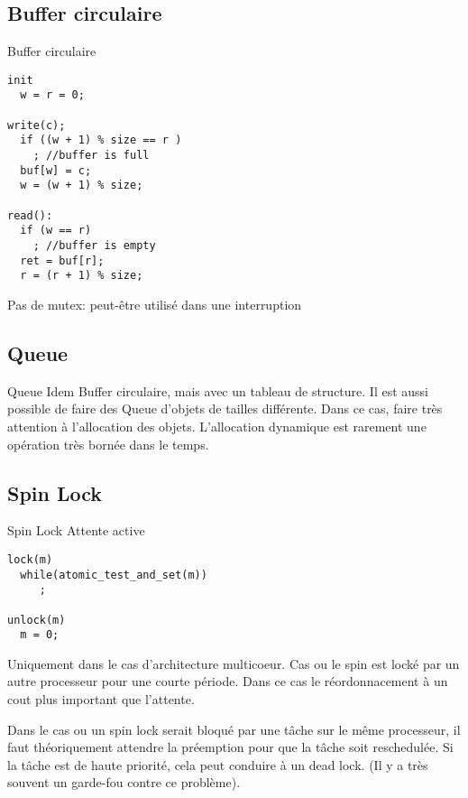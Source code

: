 \subsection{Buffer circulaire}
\begin{frame}[fragile]{Buffer circulaire}
\begin{lstlisting} 
init
  w = r = 0;

write(c);
  if ((w + 1) % size == r )
    ; //buffer is full
  buf[w] = c;
  w = (w + 1) % size;

read():
  if (w == r)
    ; //buffer is empty
  ret = buf[r];
  r = (r + 1) % size;
\end{lstlisting} 

Pas de mutex: peut-être utilisé dans une interruption
\end{frame} 

\subsection{Queue}
\begin{frame}{Queue}
Idem  Buffer circulaire,  mais avec  un tableau  de structure.  Il est
aussi possible de faire des Queue d'objets de tailles différente. Dans
ce cas,  faire très attention à l'allocation  des objets. L'allocation
dynamique est rarement une opération très bornée dans le temps.
\end{frame} 

\subsection{Spin Lock}
\begin{frame}[fragile]{Spin Lock}
Attente active
\begin{lstlisting} 
lock(m)
  while(atomic_test_and_set(m))
     ;

unlock(m)
  m = 0;
\end{lstlisting} 

Uniquement dans le  cas d'architecture multicoeur. Cas ou  le spin est
locké par un autre processeur pour  une courte période. Dans ce cas le
réordonnacement à un cout plus important que l'attente.

Dans le cas  ou un spin lock  serait bloqué par une tâche  sur le même
processeur, il  faut théoriquement attendre la préemption  pour que la
tâche soit reschedulée.  Si la tâche est de  haute priorité, cela peut
conduire à un  dead lock. (Il y a très souvent  un garde-fou contre ce
problème).
\end{frame} 

